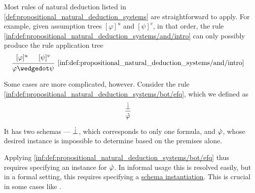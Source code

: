 \begin{remark}\label{rem:natural_deduction_rule_application}
  Most rules of natural deduction listed in \cref{def:propositional_natural_deduction_systems} are straightforward to apply. For example, given assumption trees \( [\varphi]^u \) and \( [\psi]^v \), in that order, the rule \ref{inf:def:propositional_natural_deduction_systems/and/intro} can only possibly produce the rule application tree
  \begin{equation*}
    \begin{prooftree}
      \hypo{ [\varphi]^u }
      \hypo{ [\psi]^v }
      \infer2[\ref{inf:def:propositional_natural_deduction_systems/and/intro}]{ \varphi \synwedge \psi }
    \end{prooftree}
  \end{equation*}

  Some cases are more complicated, however. Consider the rule \ref{inf:def:propositional_natural_deduction_systems/bot/efq}, which we defined as
  \begin{equation*}
    \begin{prooftree}
      \hypo{ \synbot }
      \infer1{ \syn\varphi }
    \end{prooftree}
  \end{equation*}

  It has two schemas --- \( \dot{\bot} \), which corresponds to only one formula, and \( \dot{\varphi} \), whose desired instance is impossible to determine based on the premises alone.

  Applying \ref{inf:def:propositional_natural_deduction_systems/bot/efq} thus requires specifying an instance for \( \dot{\varphi} \). In informal usage this is resolved easily, but in a formal setting, this requires specifying a \hyperref[def:propositional_schema_instantiation]{schema instantiation}. This is crucial in some cases like .
\end{remark}

